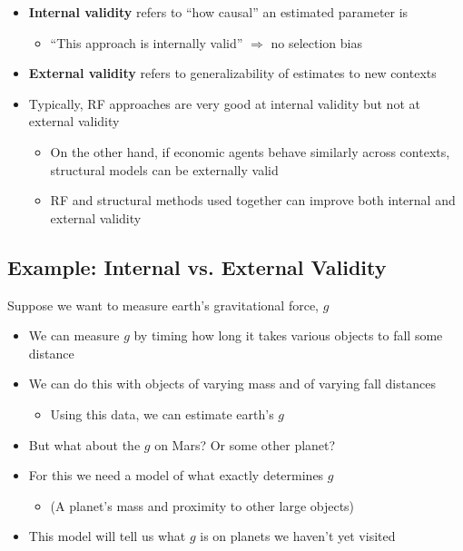 \documentclass[11pt]{article}
\begin{document}
\begin{itemize}
\item \textbf{Internal validity} refers to ``how causal'' an estimated parameter is
\begin{itemize}
\item ``This approach is internally valid'' \(\Rightarrow\) no selection bias
\end{itemize}

\item \textbf{External validity} refers to generalizability of estimates to new contexts
\item Typically, RF approaches are very good at internal validity but not at external validity
\begin{itemize}
\item On the other hand, if economic agents behave similarly across contexts, structural models can be externally valid
\item RF and structural methods used together can improve both internal and external validity
\end{itemize}
\end{itemize}


\subsection{Example: Internal vs. External Validity}
\label{sec:org6087d04}

Suppose we want to measure earth's gravitational force, \(g\)

\begin{itemize}
\item We can measure \(g\) by timing how long it takes various objects to fall some distance
\item We can do this with objects of varying mass and of varying fall distances
\begin{itemize}
\item Using this data, we can estimate earth's \(g\)
\end{itemize}
\item But what about the \(g\) on Mars? Or some other planet?
\item For this we need a model of what exactly determines \(g\)
\begin{itemize}
\item (A planet's mass and proximity to other large objects)
\end{itemize}
\item This model will tell us what \(g\) is on planets we haven't yet visited
\end{itemize}
\end{document}
